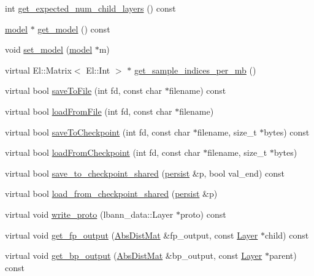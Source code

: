 \begin{DoxyCompactItemize}
\item 
int \hyperlink{classlbann_1_1Layer_aaeef8c7631204fc415a94dcdfbcfe93d}{get\+\_\+expected\+\_\+num\+\_\+child\+\_\+layers} () const
\item 
\hyperlink{classlbann_1_1model}{model} $\ast$ \hyperlink{classlbann_1_1Layer_afcfb6f55d12c728a59d107fe2d2fff0d}{get\+\_\+model} () const
\item 
void \hyperlink{classlbann_1_1Layer_a8eed87b25ea902b223c6b7a23abf78b3}{set\+\_\+model} (\hyperlink{classlbann_1_1model}{model} $\ast$m)
\item 
virtual El\+::\+Matrix$<$ El\+::\+Int $>$ $\ast$ \hyperlink{classlbann_1_1Layer_a0ac13af6f5ee8316d64c550bef919ee0}{get\+\_\+sample\+\_\+indices\+\_\+per\+\_\+mb} ()
\item 
virtual bool \hyperlink{classlbann_1_1Layer_a131876b692c0e68c95d9ae1a86c446df}{save\+To\+File} (int fd, const char $\ast$filename) const
\item 
virtual bool \hyperlink{classlbann_1_1Layer_a1ae0e6015dd427c63236a07f8cbd3878}{load\+From\+File} (int fd, const char $\ast$filename)
\item 
virtual bool \hyperlink{classlbann_1_1Layer_a994a4beabbace598193b1611eb06b07e}{save\+To\+Checkpoint} (int fd, const char $\ast$filename, size\+\_\+t $\ast$bytes) const
\item 
virtual bool \hyperlink{classlbann_1_1Layer_a7ac9335d75d817fc2d5cf171da9b7e22}{load\+From\+Checkpoint} (int fd, const char $\ast$filename, size\+\_\+t $\ast$bytes)
\item 
virtual bool \hyperlink{classlbann_1_1Layer_afce0efa0f1c8f3b1c61069536b2fa8cc}{save\+\_\+to\+\_\+checkpoint\+\_\+shared} (\hyperlink{classlbann_1_1persist}{persist} \&p, bool val\+\_\+end) const
\item 
virtual bool \hyperlink{classlbann_1_1Layer_a9e262970ecc64166e8b6610e2502ad30}{load\+\_\+from\+\_\+checkpoint\+\_\+shared} (\hyperlink{classlbann_1_1persist}{persist} \&p)
\item 
virtual void \hyperlink{classlbann_1_1Layer_ab94eb4ac28bac0c472a1da83ade4adf1}{write\+\_\+proto} (lbann\+\_\+data\+::\+Layer $\ast$proto) const
\item 
virtual void \hyperlink{classlbann_1_1Layer_ac6b43c63399f717cc1a4a0a2007350f2}{get\+\_\+fp\+\_\+output} (\hyperlink{base_8hpp_a9a697a504ae84010e7439ffec862b470}{Abs\+Dist\+Mat} \&fp\+\_\+output, const \hyperlink{classlbann_1_1Layer}{Layer} $\ast$child) const
\item 
virtual void \hyperlink{classlbann_1_1Layer_a81f9f4fc956daf4838a7ed248427b1f3}{get\+\_\+bp\+\_\+output} (\hyperlink{base_8hpp_a9a697a504ae84010e7439ffec862b470}{Abs\+Dist\+Mat} \&bp\+\_\+output, const \hyperlink{classlbann_1_1Layer}{Layer} $\ast$parent) const

\end{DoxyCompactItemize}
